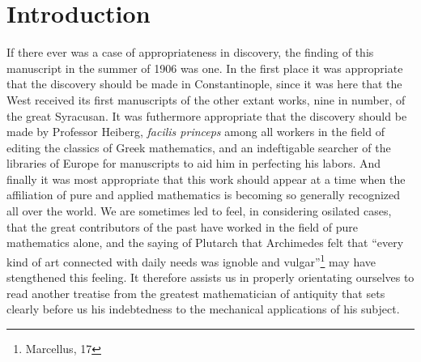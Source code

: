 \documentclass[oneside,12pt]{book}
\begin{document}
\chapter{Introduction}
If there ever was a case of appropriateness in discovery, the finding of this manuscript in the summer of 1906 was one. In the first place it was appropriate that the discovery should be made in Constantinople, since it was here that the West received its first manuscripts of the other extant works, nine in number, of the great Syracusan. It was futhermore appropriate that the discovery should be made by Professor Heiberg, \textit{facilis princeps} among all workers in the field of editing the classics of Greek mathematics, and an indeftigable searcher of the libraries of Europe for manuscripts to aid him in perfecting his labors. And finally it was most appropriate that this work should appear at a time when the affiliation of pure and applied mathematics is becoming so generally recognized all over the world. We are sometimes led to feel, in considering osilated cases, that the great contributors of the past have worked in the field of pure mathematics alone, and the saying of Plutarch that Archimedes felt that ``every kind of art connected with daily needs was ignoble and vulgar''\footnote{Marcellus, 17} may have stengthened this feeling. It therefore assists us in properly orientating ourselves to read another treatise from the greatest mathematician of antiquity that sets clearly before us his indebtedness to the mechanical applications of his subject. \par 
\end{document}
